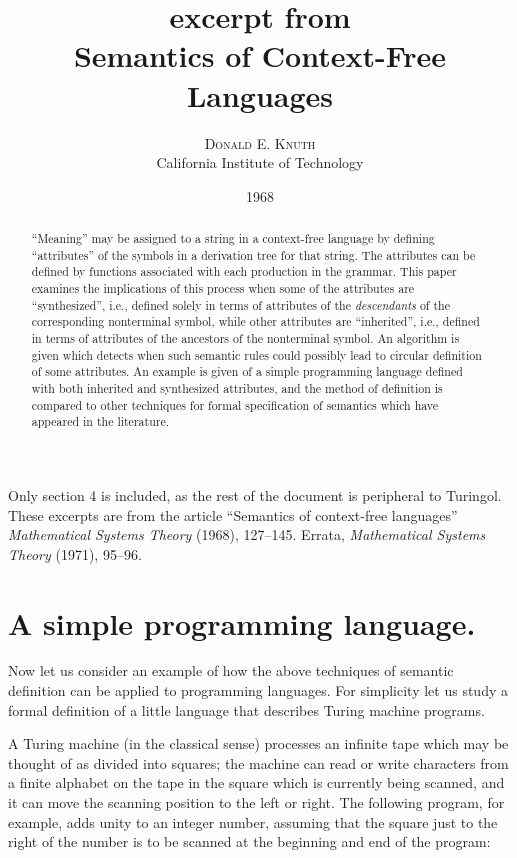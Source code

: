 \documentclass[a4paper]{article}
\begin{document}
\title{excerpt from \\ \bfseries{Semantics of Context-Free Languages}}
\author{\textsc{Donald E. Knuth}\\
	California Institute of Technology}
\date{1968}
\maketitle

\begin{abstract}
``Meaning'' may be assigned to a string in a context-free language by defining
``attributes'' of the symbols in a derivation tree for that string. The
attributes can be defined by functions associated with each production in the
grammar. This paper examines the implications of this process when some of the
attributes are ``synthesized'', i.e., defined solely in terms of attributes of
the \emph{descendants} of the corresponding nonterminal symbol, while other
attributes are ``inherited'', i.e., defined in terms of attributes of the
ancestors of the nonterminal symbol. An algorithm is given which detects when
such semantic rules could possibly lead to circular definition of some
attributes. An example is given of a simple programming language defined with
both inherited and synthesized attributes, and the method of definition is
compared to other techniques for formal specification of semantics which have
appeared in the literature.
\end{abstract}

Only section 4 is included, as the rest of the document is peripheral to
Turingol. These excerpts are from the article ``Semantics of context-free
languages'' \emph{Mathematical Systems Theory} (1968), 127--145. 
Errata, \emph{Mathematical Systems Theory} (1971), 95--96.

\setcounter{section}{3}

\section{A simple programming language.}

Now let us consider an example of how the above techniques of semantic
definition can be applied to programming languages. For simplicity let us study
a formal definition of a little language that describes Turing machine
programs.

A Turing machine (in the classical sense) processes an infinite tape which may
be thought of as divided into squares; the machine can read or write characters
from a finite alphabet on the tape in the square which is currently being
scanned, and it can move the scanning position to the left or right. The
following program, for example, adds unity to an integer number, assuming that
the square just to the right of the number is to be scanned at the beginning
and end of the program:
\end{document}
